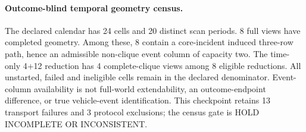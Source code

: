 \paragraph{Outcome-blind temporal geometry census.}
The declared calendar has 24 cells and 20 distinct scan periods. 8 full views have completed geometry.
Among these, 8 contain a core-incident induced three-row path, hence an admissible non-clique event column of capacity two.
The time-only 4+12 reduction has 4 complete-clique views among 8 eligible reductions.
All unstarted, failed and ineligible cells remain in the declared denominator.
Event-column availability is not full-world extendability, an outcome-endpoint difference, or true vehicle-event identification.
This checkpoint retains 13 transport failures and 3 protocol exclusions; the census gate is HOLD INCOMPLETE OR INCONSISTENT.
